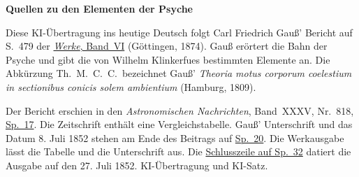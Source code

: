 \clearpage\thispagestyle{empty}
\begin{center}\textbf{Quellen zu den Elementen der Psyche}\end{center}
\noindent Diese KI-Übertragung ins heutige Deutsch folgt Carl Friedrich Gauß’ Bericht auf S.~479 der \href{https://gdz.sub.uni-goettingen.de/id/PPN236007467}{\textit{Werke}, Band~VI} (Göttingen, 1874). Gauß erörtert die Bahn der Psyche und gibt die von Wilhelm Klinkerfues bestimmten Elemente an. Die Abkürzung Th.\ M.\ C.\ C.\ bezeichnet Gauß’ \textit{Theoria motus corporum coelestium in sectionibus conicis solem ambientium} (Hamburg, 1809).
\par\smallskip\noindent Der Bericht erschien in den \textit{Astronomischen Nachrichten}, Band~XXXV, Nr.~818, \href{https://api.digitale-sammlungen.de/iiif/image/v2/bsb10049460_00013/full/1800,/0/default.jpg}{Sp.~17}. Die Zeitschrift enthält eine Vergleichstabelle. Gauß’ Unterschrift und das Datum 8. Juli 1852 stehen am Ende des Beitrags auf \href{https://api.digitale-sammlungen.de/iiif/image/v2/bsb10049460_00014/full/1800,/0/default.jpg}{Sp.~20}. Die Werkausgabe lässt die Tabelle und die Unterschrift aus. Die \href{https://api.digitale-sammlungen.de/iiif/image/v2/bsb10049460_00020/full/1800,/0/default.jpg}{Schlusszeile auf Sp.~32} datiert die Ausgabe auf den 27. Juli 1852. KI-Übertragung und KI-Satz.
\clearpage
